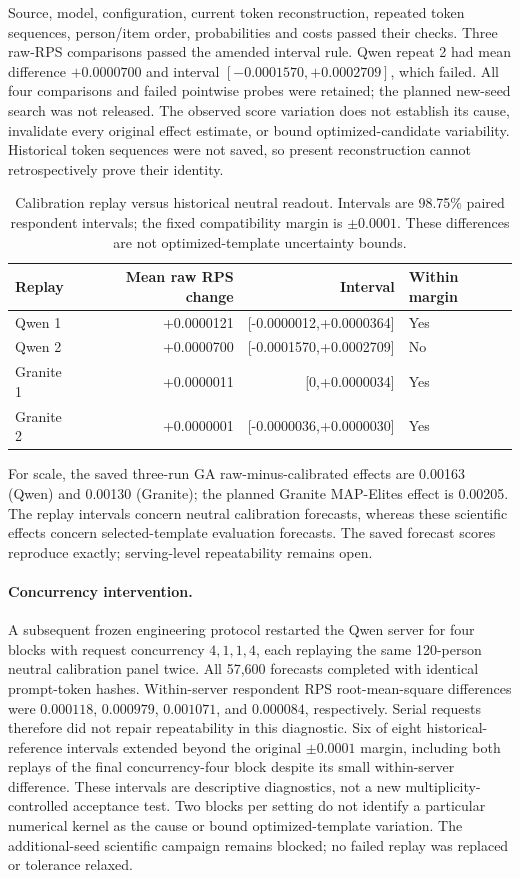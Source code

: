 \documentclass[sigconf,anonymous]{aamas}
\begin{document}
Source, model, configuration, current token reconstruction, repeated token
sequences, person/item order, probabilities and costs passed their checks.
Three raw-RPS comparisons passed the amended interval rule. Qwen repeat 2
had mean difference $+0.0000700$ and interval $[-0.0001570,+0.0002709]$,
which failed. All four comparisons and failed pointwise probes were retained;
the planned new-seed search was not released. The observed score variation
does not establish its cause, invalidate every original effect estimate, or
bound optimized-candidate variability. Historical token sequences were not
saved, so present reconstruction cannot retrospectively prove their identity.

\begin{table}[H]\centering\small
\caption{Calibration replay versus historical neutral readout. Intervals are
98.75\% paired respondent intervals; the fixed compatibility margin is
$\pm0.0001$. These differences are not optimized-template uncertainty bounds.}
\begin{tabular}{@{}lrrl@{}}\toprule
Replay & Mean raw RPS change & Interval & Within margin\\\midrule
Qwen 1 & +0.0000121 & [-0.0000012,+0.0000364] & Yes\\
Qwen 2 & +0.0000700 & [-0.0001570,+0.0002709] & No\\
Granite 1 & +0.0000011 & [0,+0.0000034] & Yes\\
Granite 2 & +0.0000001 & [-0.0000036,+0.0000030] & Yes\\\bottomrule
\end{tabular}\end{table}
For scale, the saved three-run GA raw-minus-calibrated effects are 0.00163
(Qwen) and 0.00130 (Granite); the planned Granite MAP-Elites effect is 0.00205.
The replay intervals concern neutral calibration forecasts, whereas these
scientific effects concern selected-template evaluation forecasts. The saved
forecast scores reproduce exactly; serving-level repeatability remains open.

\paragraph{Concurrency intervention.}
A subsequent frozen engineering protocol restarted the Qwen server for four
blocks with request concurrency $4,1,1,4$, each replaying the same 120-person
neutral calibration panel twice. All 57,600 forecasts completed with identical
prompt-token hashes. Within-server respondent RPS root-mean-square differences
were $0.000118$, $0.000979$, $0.001071$, and $0.000084$, respectively.
Serial requests therefore did not repair repeatability in this diagnostic.
Six of eight historical-reference intervals extended beyond the original
$\pm0.0001$ margin, including both replays of the final concurrency-four block
despite its small within-server difference. These intervals are descriptive
diagnostics, not a new multiplicity-controlled acceptance test. Two blocks per
setting do not identify a particular numerical kernel as the cause or bound
optimized-template variation. The additional-seed scientific campaign remains
blocked; no failed replay was replaced or tolerance relaxed.
\end{document}
